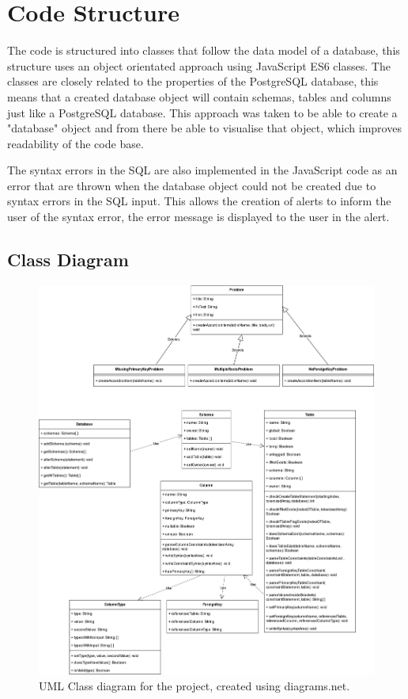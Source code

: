 \section{Code Structure}

The code is structured into classes that follow the data model of a database, this structure uses an object orientated approach using JavaScript ES6 classes. The classes are closely related to the properties of the PostgreSQL database, this means that a created database object will contain schemas, tables and columns just like a PostgreSQL database. This approach was taken to be able to create a "database" object and from there be able to visualise that object, which improves readability of the code base. 

The syntax errors in the SQL are also implemented in the JavaScript code as an error that are thrown when the database object could not be created due to syntax errors in the SQL input. This allows the creation of alerts to inform the user of the syntax error, the error message is displayed to the user in the alert.

\newpage

\subsection{Class Diagram}

\begin{figure}[h!]
	\centering
	\includegraphics[width=\textwidth]{classDiagram}
	\caption{UML Class diagram for the project, created using diagrams.net\cite{dbdiagram}.}
	\label{fig:classDiagram}
\end{figure}

